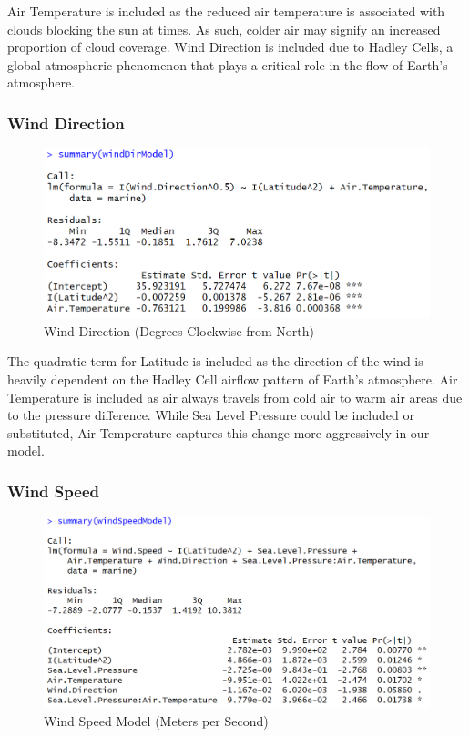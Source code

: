 \documentclass{article}
\begin{document}
Air Temperature is included as the reduced air temperature is associated with clouds blocking the sun at times. As such, colder air may signify an increased proportion of cloud coverage. Wind Direction is included due to Hadley Cells, a global atmospheric phenomenon that plays a critical role in the flow of Earth's atmosphere. 

\newpage

\subsubsection*{Wind Direction}

\begin{figure}[h]
    \centering
    \includegraphics[scale = 0.6]{code snippets/summaryWindDir.PNG}
    \caption{Wind Direction (Degrees Clockwise from North)}
    \label{fig:WindDirectionModel}
\end{figure}

The quadratic term for Latitude is included as the direction of the wind is heavily dependent on the Hadley Cell airflow pattern of Earth's atmosphere. Air Temperature is included as air always travels from cold air to warm air areas due to the pressure difference. While Sea Level Pressure could be included or substituted, Air Temperature captures this change more aggressively in our model.

\subsubsection*{Wind Speed}

\begin{figure}[h]
    \centering
    \includegraphics[scale = 0.6]{code snippets/summaryWindSpeed.PNG}
    \caption{Wind Speed Model (Meters per Second)}
    \label{fig:WindSpeedModel}
\end{figure}
\end{document}
